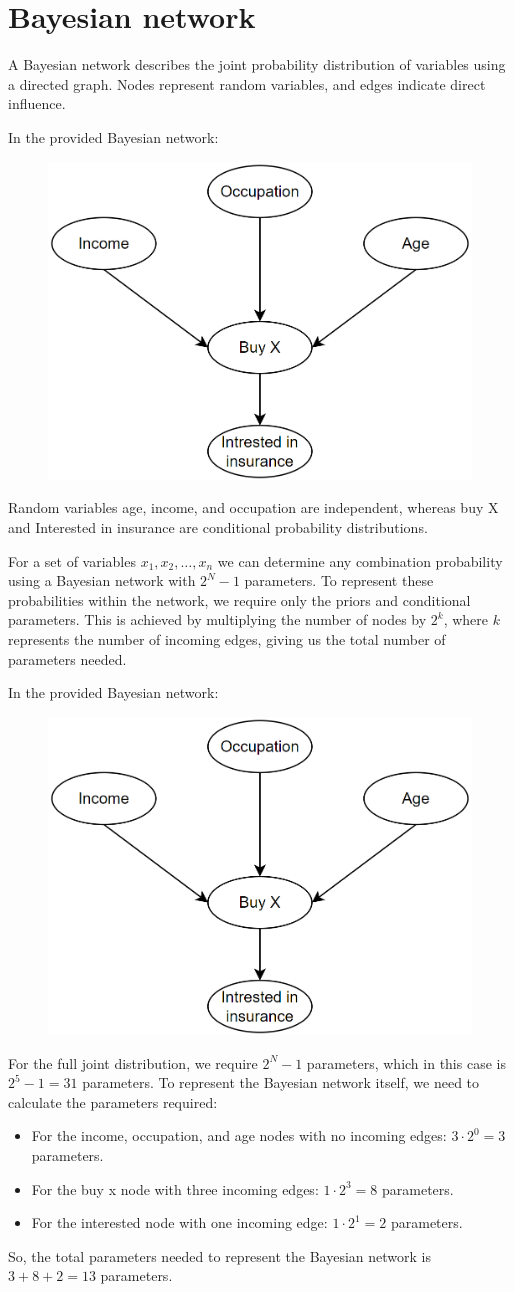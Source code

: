 \section{Bayesian network}

A Bayesian network describes the joint probability distribution of variables using a directed graph. 
Nodes represent random variables, and edges indicate direct influence.
\begin{example}
    In the provided Bayesian network:
    \begin{figure}[H]
        \centering
        \includegraphics[width=0.4\linewidth]{images/insurance.png}
    \end{figure}
    Random variables age, income, and occupation are independent, whereas buy X and Interested in insurance are conditional probability distributions.
\end{example}
For a set of variables $x_1, x_2, \ldots, x_n$ we can determine any combination probability using a Bayesian network with $2^N - 1$ parameters. 
To represent these probabilities within the network, we require only the priors and conditional parameters. 
This is achieved by multiplying the number of nodes by $2^k$, where $k$ represents the number of incoming edges, giving us the total number of parameters needed.
\begin{example}
    In the provided Bayesian network:
    \begin{figure}[H]
        \centering
        \includegraphics[width=0.4\linewidth]{images/insurance.png}
    \end{figure}
    For the full joint distribution, we require $2^N - 1$ parameters, which in this case is $2^5 - 1 = 31$ parameters.
    To represent the Bayesian network itself, we need to calculate the parameters required:
    \begin{itemize}
        \item For the income, occupation, and age nodes with no incoming edges: $3 \cdot 2^0 = 3$ parameters.
        \item For the buy x node with three incoming edges: $1 \cdot 2^3 = 8$ parameters.
        \item For the interested node with one incoming edge: $1 \cdot 2^1 = 2$ parameters.
    \end{itemize}
    So, the total parameters needed to represent the Bayesian network is $3 + 8 + 2 = 13$ parameters.
\end{example}
